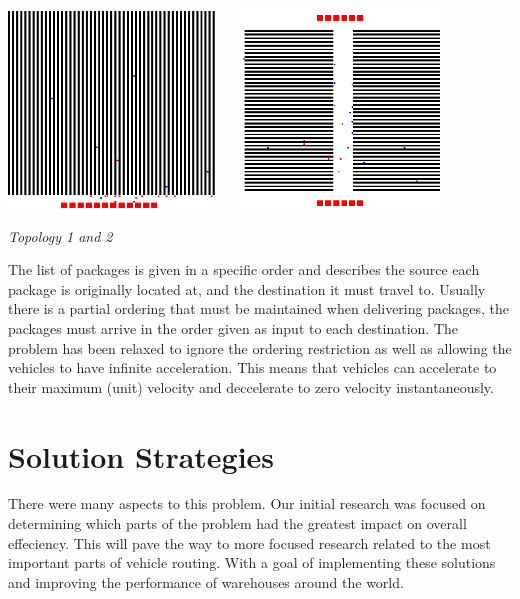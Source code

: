 \documentclass[11pt]{article}
\begin{document}
\begin{center}
\includegraphics[height=200px]{topo_1.png} \ \ \ 
\includegraphics[height=200px]{topo_2.png}
\vspace{.1in}

\textit{Topology 1 and 2}
\end{center}

The list of packages is given in a specific order and describes the source each package is originally located at, and the destination it must travel to. Usually there is a partial ordering that must be maintained when delivering packages, the packages must arrive in the order given as input to each destination. The problem has been relaxed to ignore the ordering restriction as well as allowing the vehicles to have infinite acceleration. This means that vehicles can accelerate to their maximum (unit) velocity and deccelerate to zero velocity instantaneously.

\section{Solution Strategies}

There were many aspects to this problem. Our initial research was focused on determining which parts of the problem had the greatest impact on overall effeciency. This will pave the way to more focused research related to the most important parts of vehicle routing. With a goal of implementing these solutions and improving the performance of warehouses around the world.
\end{document}
